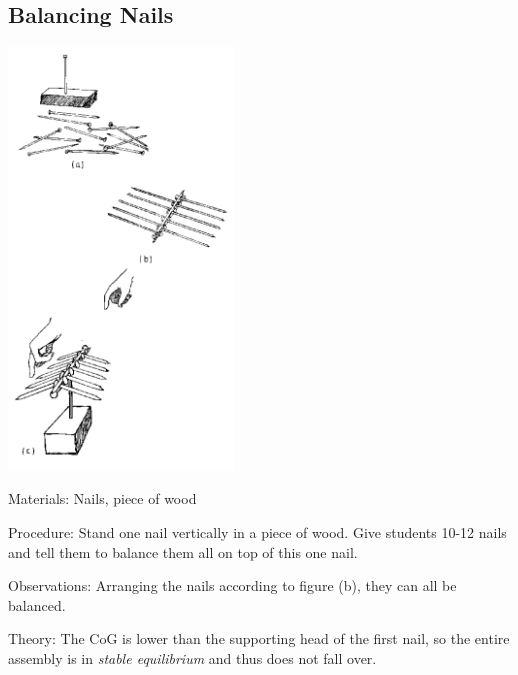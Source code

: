 \begin{multicols}{2}
\columnbreak

\subsection{Balancing Nails}

\begin{center}
\includegraphics[width=0.45\textwidth]{./img/source/nails-1.png}
\end{center}

\begin{description*}
\item[Materials:]{Nails, piece of wood}
\item[Procedure:]{Stand one nail vertically in a piece of wood. Give students 10-12 nails and tell them to balance them all on top of this one nail.}
\item[Observations:]{Arranging the nails according to figure (b), they can all be balanced.}
\item[Theory:]{The CoG is lower than the supporting head of the first nail, so the entire assembly is in \emph{stable equilibrium} and thus does not fall over.}
\end{description*}


\end{multicols}

\pagebreak